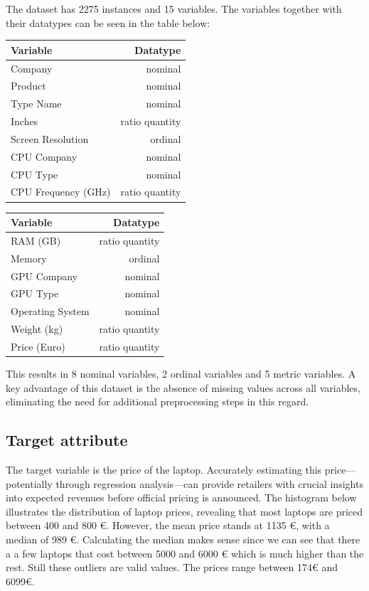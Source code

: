 \documentclass{article}
\begin{document}
The dataset has 2275 instances and 15 variables. The variables together with their datatypes can be seen in the table below:

\begin{table}[H]
    \parbox{.40\linewidth}{
        \begin{tabular}{l|r}
            \textbf{Variable} & \textbf{Datatype} \\\hline
            Company & nominal \\
            Product & nominal \\
            Type Name & nominal \\
            Inches & ratio quantity \\
            Screen Resolution & ordinal \\
            CPU Company & nominal \\
            CPU Type & nominal \\
            CPU Frequency (GHz) & ratio quantity
        \end{tabular}
}
    \hfill
    \parbox{.40\linewidth}{
        \begin{tabular}{l|r}
            \textbf{Variable} & \textbf{Datatype} \\\hline
            RAM (GB) & ratio quantity \\
            Memory & ordinal \\
            GPU Company & nominal \\
            GPU Type & nominal \\
            Operating System & nominal \\
            Weight (kg) & ratio quantity \\
            Price (Euro) & ratio quantity 
        \end{tabular}}
        
\end{table}

This results in 8 nominal variables, 2 ordinal variables and 5 metric variables. A key advantage of this dataset is the absence of missing values across all variables, eliminating the need for additional preprocessing steps in this regard.

\subsection{Target attribute}
The target variable is the price of the laptop. Accurately estimating this price—potentially through regression analysis—can provide retailers with crucial insights into expected revenues before official pricing is announced. The histogram below illustrates the distribution of laptop prices, revealing that most laptops are priced between 400 and 800 €. However, the mean price stands at 1135 €, with a median of 989 €. Calculating the median makes sense since we can see that there a a few laptops that cost between 5000 and 6000 € which is much higher than the rest. Still these outliers are valid values. The prices range between 174€ and 6099€.
\end{document}
